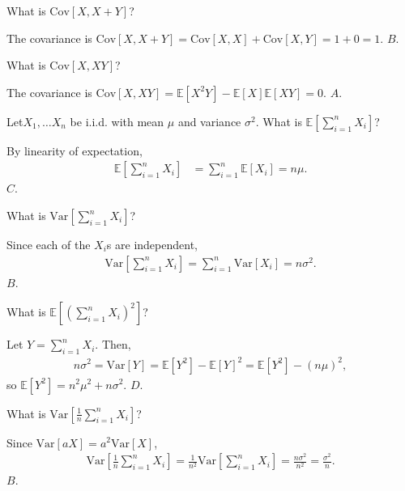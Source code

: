 \documentclass[a4paper]{article}
\begin{document}
\begin{Exercise}
	What is $\text{Cov}[X, X + Y]$?
\end{Exercise}
\begin{Solution}
	The covariance is $\text{Cov}[X, X + Y] = \text{Cov}[X, X] + \text{Cov}[X, Y] = 1 + 0 = 1.$ $\boxed{B}$.
\end{Solution}
\begin{Exercise}
	What is $\text{Cov}[X, XY]$?
\end{Exercise}
\begin{Solution}
	The covariance is $\text{Cov}[X, XY] = \mathbb{E}[X^2Y] - \mathbb{E}[X] \mathbb{E}[XY] = 0.$ $\boxed{A}$.
\end{Solution}
\begin{Exercise}
\end{Exercise}
\begin{Exercise}
\end{Exercise}
\begin{Exercise}
	Let$X_1, \ldots X_n$ be i.i.d. with mean $\mu$ and variance $\sigma^2$. What is $\mathbb{E}\left[\sum_{i = 1}^n X_i\right]$?
\end{Exercise}
\begin{Solution}
	By linearity of expectation,
	\begin{align*}
		\mathbb{E} \left[ \sum_{i = 1}^{n} X_i \right] &= \sum_{i = 1}^{n} \mathbb{E}[X_i] = n \mu.
	\end{align*}
	$\boxed{C}$.
\end{Solution}
\begin{Exercise}
	What is $\text{Var}[\sum_{i = 1}^{n} X_i]$?
\end{Exercise}
\begin{Solution}
	Since each of the $X_i$s are independent,
	\begin{align*}
		\text{Var}\left[ \sum_{i = 1}^{n} X_i \right] = \sum_{i = 1}^{n} \text{Var}[X_i] = n \sigma^2.
	\end{align*}
	$\boxed{B}$.
\end{Solution}
\begin{Exercise}
	What is $\mathbb{E}[(\sum_{i = 1}^{n} X_i)^2]$?
\end{Exercise}
\begin{Solution}
	Let $Y = \sum_{i = 1}^{n} X_i$. Then,
	\begin{align*}
		n\sigma^2 = \text{Var}[Y] = \mathbb{E}[Y^2] - \mathbb{E}[Y]^2 = \mathbb{E}[Y^2] - (n \mu)^2,
	\end{align*}
	so $\mathbb{E}[Y^2] = n^2 \mu^2 + n \sigma^2.$ $\boxed{D}$.
\end{Solution}
\begin{Exercise}
	What is $\text{Var}\left[\frac{1}{n} \sum_{i = 1}^{n} X_i \right]$?
\end{Exercise}
\begin{Solution}
	Since $\text{Var}[aX] = a^2 \text{Var}[X]$,
	\begin{align*}
		\text{Var} \left[ \frac{1}{n} \sum_{i = 1}^{n} X_i \right] = \frac{1}{n^2}\text{Var} \left[ \sum_{i = 1}^{n} X_i \right] = \frac{n \sigma^2}{n^2} = \frac{\sigma^2}{n}.
	\end{align*}
	$\boxed{B}$.
\end{Solution}
\end{document}

